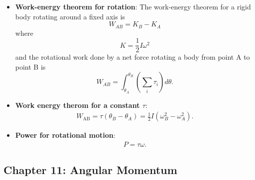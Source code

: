 \documentclass{report}
\begin{document}
\begin{itemize}
    \item \textbf{Work-energy theorem for rotation}:
        The work-energy theorem for a rigid body rotating around a fixed axis is
        \[
            W_{AB} = K_B - K_A
        \]
        where
        \[
            K = \frac{1}{2}I\omega^2
        \]
        and the rotational work done by a net force rotating a body from point A to point B is
        \[
            W_{AB} = \int_{\theta_A}^{\theta_B} \left( \sum_{i} \tau_{i} \right) d\theta.
        \]
    \item \textbf{Work energy therom for a constant $\tau$}:
        \begin{align*}
            W_{\text{AB}} = \tau(\theta_{B} - \theta_{A}) = \frac{1}{2}I(\omega_{B}^{2} - \omega_{A}^{2})
        .\end{align*}
    \item \textbf{Power for rotational motion}:
        \begin{align*}
            P = \tau\omega
        .\end{align*}

    \end{itemize}

    \pagebreak 
    \subsection{Chapter 11: Angular Momentum}
    \bigbreak \noindent 
\end{document}
